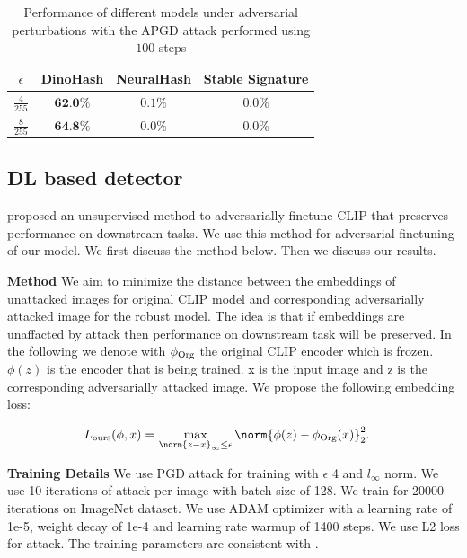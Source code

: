 {\renewcommand{\arraystretch}{1.5}
\begin{table}[h]
    \centering
    \begin{tabular}{cccc}
        \toprule
        $\epsilon$ & DinoHash & NeuralHash & Stable Signature \\
        \midrule
        $\frac{4}{255}$ & $\textbf{62.0\%}$ & $0.1\%$ & $0.0\%$ \\
        $\frac{8}{255}$ & $\textbf{64.8\%}$ & $0.0\%$ & $0.0\%$ \\
        \bottomrule
    \end{tabular}
    \caption{Performance of different models under adversarial perturbations with the APGD attack performed using $100$ steps}
    \label{tab:adv_hash}
\end{table}

}


\subsection{DL based detector}

\citet{schlarmann2024robust} proposed an unsupervised method to adversarially finetune CLIP that preserves performance on downstream tasks. We use this method for adversarial finetuning of our model. We first discuss the method below. Then we discuss our results.

\textbf{Method} We aim to minimize the distance between the embeddings of unattacked images for original CLIP model and corresponding adversarially attacked image for the robust model. The idea is that if embeddings are unaffacted by attack then performance on downstream task will be preserved. In the following we denote with $\mathop{\phi_{\rm{Org}}}\nolimits$ the original CLIP encoder which is frozen. $\phi(z)$ is the encoder that is being trained. x is the input image and z is the corresponding adversarially attacked image. We propose the following embedding loss:

\begin{align}\label{eq:fare}
L_{\textrm{ours}}(\phi,x)=&\,\max_{\norm{z-x}_\infty \leq \epsilon} \norm{\phi(z)-\phiorg(x)}^2_2.
\end{align}

\textbf{Training Details} We use PGD attack for training with $\epsilon$ 4 and $l_\infty$ norm. We use 10 iterations of attack per image with batch size of 128. We train for 20000 iterations on ImageNet dataset. We use ADAM optimizer with a learning rate of 1e-5, weight decay of 1e-4 and learning rate warmup of 1400 steps. We use L2 loss for attack. The training parameters are consistent with \citep{schlarmann2024robust}.

